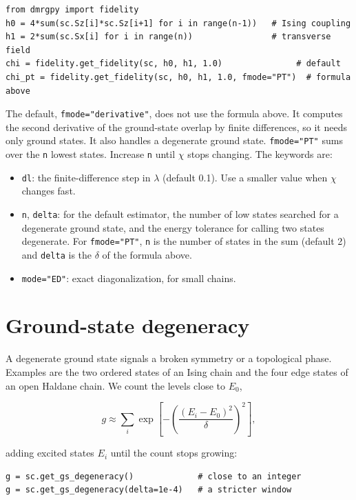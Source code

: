 \documentclass[11pt]{article}
\providecommand{\tightlist}{\setlength{\itemsep}{0pt}\setlength{\parskip}{0pt}}
\begin{document}
\begin{lstlisting}
from dmrgpy import fidelity
h0 = 4*sum(sc.Sz[i]*sc.Sz[i+1] for i in range(n-1))   # Ising coupling
h1 = 2*sum(sc.Sx[i] for i in range(n))                # transverse field
chi = fidelity.get_fidelity(sc, h0, h1, 1.0)               # default
chi_pt = fidelity.get_fidelity(sc, h0, h1, 1.0, fmode="PT")  # formula above
\end{lstlisting}

The default, \texttt{fmode="derivative"}, does not use the formula above. It
computes the second derivative of the ground-state overlap by finite
differences, so it needs only ground states. It also handles a degenerate
ground state. \texttt{fmode="PT"} sums over the \texttt{n} lowest states. Increase \texttt{n}
until \(\chi\) stops changing. The keywords are:

\begin{itemize}
\tightlist
\item
  \texttt{dl}: the finite-difference step in \(\lambda\) (default 0.1). Use a
  smaller value when \(\chi\) changes fast.
\item
  \texttt{n}, \texttt{delta}: for the default estimator, the number of low states
  searched for a degenerate ground state, and the energy tolerance for
  calling two states degenerate. For \texttt{fmode="PT"}, \texttt{n} is the number of
  states in the sum (default 2) and \texttt{delta} is the \(\delta\) of the
  formula above.
\item
  \texttt{mode="ED"}: exact diagonalization, for small chains.
\end{itemize}

\section{Ground-state degeneracy}

A degenerate ground state signals a broken symmetry or a topological
phase. Examples are the two ordered states of an Ising chain and the four
edge states of an open Haldane chain. We count the levels close to \(E_0\),

\[g\approx\sum_i\exp\!\left[-\left(\frac{(E_i-E_0)^2}{\delta}\right)^2\right],\]

adding excited states \(E_i\) until the count stops growing:

\begin{lstlisting}
g = sc.get_gs_degeneracy()             # close to an integer
g = sc.get_gs_degeneracy(delta=1e-4)   # a stricter window
\end{lstlisting}
\end{document}
